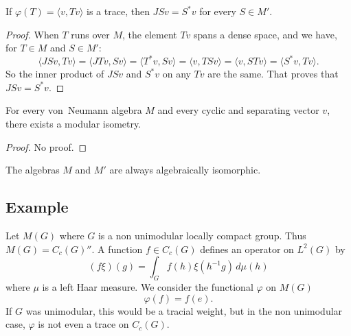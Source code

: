\begin{proposition}
If $\varphi(T)=\langle v, Tv\rangle $ is a trace, then $JSv=S^*v$ for every $S\in M'$.
\end{proposition}

\begin{proof}
When $T$ runs over $M$, the element $Tv$ spans a dense space, and we have, for $T\in M$ and $S\in M'$:
\begin{equation}
	\langle JSv, Tv\rangle =\langle JTv, Sv\rangle =\langle T^*v, Sv\rangle =\langle v, TSv\rangle =\langle v, STv\rangle =\langle S^*v, Tv\rangle .
\end{equation}
So the inner product of $JSv$ and $S^*v$ on any $Tv$ are the same. That proves that $JSv=S^*v$.
\end{proof}

\begin{theorem}
For every von~Neumann algebra $M$ and every cyclic and separating vector $v$, there exists a modular isometry.
\end{theorem}

\begin{proof}
No proof.
\end{proof}

\begin{corollary}
The algebras $M$ and $M'$ are always algebraically isomorphic.
\end{corollary}

					\subsection{Example}

Let $M(G)$ where $G$ is a non unimodular locally compact group. Thus $M(G)=C_c(G)''$. A function $f\in C_c(G)$ defines an operator on $L^2(G)$ by
\begin{equation}
	(f\xi)(g)=\int_{G}f(h)\xi(h^{-1} g)\,d\mu(h)
\end{equation}
where $\mu$ is a left Haar measure. We consider the functional $\varphi$ on $M(G)$
\begin{equation}
	\varphi(f)=f(e).
\end{equation}
If $G$ was unimodular, this would be a tracial weight, but in the non unimodular case, $\varphi$ is not even a trace on $C_c(G)$. 

